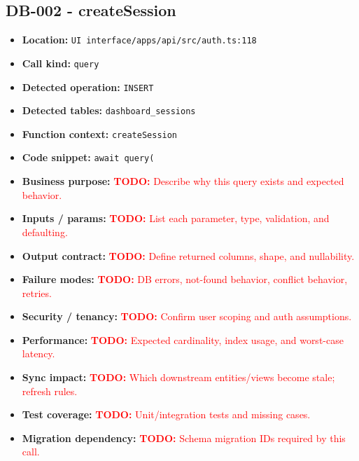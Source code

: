 \documentclass[11pt]{article}
\newcommand{\todoitem}[1]{\textcolor{red}{\textbf{TODO:} #1}}
\begin{document}
\subsection{DB-002 - createSession}
\begin{itemize}[leftmargin=1.5em]
\item \textbf{Location:} \texttt{UI interface/apps/api/src/auth.ts:118}
\item \textbf{Call kind:} \texttt{query}
\item \textbf{Detected operation:} \texttt{INSERT}
\item \textbf{Detected tables:} \texttt{dashboard\_sessions}
\item \textbf{Function context:} \texttt{createSession}
\item \textbf{Code snippet:} \texttt{await query(}
\item \textbf{Business purpose:} \todoitem{Describe why this query exists and expected behavior.}
\item \textbf{Inputs / params:} \todoitem{List each parameter, type, validation, and defaulting.}
\item \textbf{Output contract:} \todoitem{Define returned columns, shape, and nullability.}
\item \textbf{Failure modes:} \todoitem{DB errors, not-found behavior, conflict behavior, retries.}
\item \textbf{Security / tenancy:} \todoitem{Confirm user scoping and auth assumptions.}
\item \textbf{Performance:} \todoitem{Expected cardinality, index usage, and worst-case latency.}
\item \textbf{Sync impact:} \todoitem{Which downstream entities/views become stale; refresh rules.}
\item \textbf{Test coverage:} \todoitem{Unit/integration tests and missing cases.}
\item \textbf{Migration dependency:} \todoitem{Schema migration IDs required by this call.}
\end{itemize}
\end{document}
